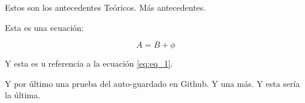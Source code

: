 Estos son los antecedentes Teóricos. Más antecedentes.

Esta es una ecuación:

\begin{equation}
	A = B + \phi
	\label{eq:eq_1}
\end{equation}

Y esta es u referencia a la ecuación \eqref{eq:eq_1}. 

Y por último una prueba del auto-guardado en Github. Y una más. 
Y esta sería la última.